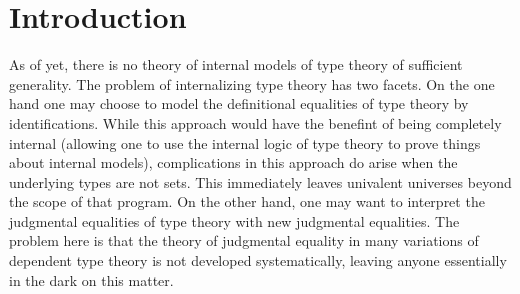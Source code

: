 \section{Introduction}

As of yet, there is no theory of internal models of type theory of sufficient
generality. The problem of internalizing type theory has two facets. On the one
hand one may choose to model the definitional equalities of type theory by
identifications. While this approach would have the benefint of being completely
internal (allowing one to use the internal logic of type theory to prove things
about internal models), complications in this approach do arise when the 
underlying types are not sets. This immediately leaves univalent universes beyond
the scope of that program. On the other hand, one may want to interpret the
judgmental equalities of type theory with new judgmental equalities. The problem
here is that the theory of judgmental equality in many variations of dependent
type theory is not developed systematically, leaving anyone essentially in the
dark on this matter.

